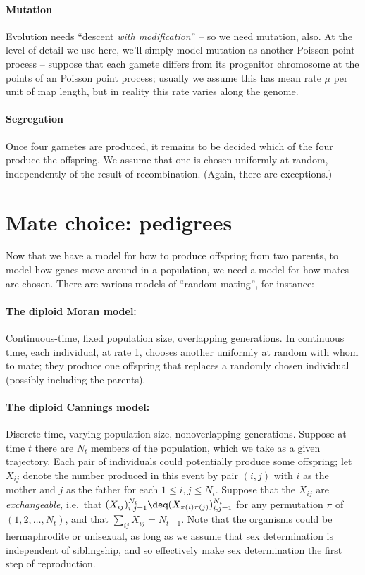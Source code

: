 \paragraph{Mutation}
Evolution needs ``descent \emph{with modification}'' -- so we need mutation, also.
At the level of detail we use here, we'll simply model mutation as another Poisson point process --
suppose that each gamete differs from its progenitor chromosome at the points of an Poisson point process;
usually we assume this has mean rate $\mu$ per unit of map length,
but in reality this rate varies along the genome.

\paragraph{Segregation}
Once four gametes are produced, it remains to be decided which of the four produce the offspring.
We assume that one is chosen uniformly at random,
independently of the result of recombination.
(Again, there are exceptions.)


\section{Mate choice: pedigrees}

Now that we have a model for how to produce offspring from two parents,
to model how genes move around in a population,
we need a model for how mates are chosen.
There are various models of ``random mating'',
for instance:

\paragraph{The diploid Moran model:}
Continuous-time, fixed population size, overlapping generations.
In continuous time, each individual, at rate 1, chooses another uniformly at random
with whom to mate;
they produce one offspring
that replaces a randomly chosen individual (possibly including the parents).

\paragraph{The diploid Cannings model:}
Discrete time, varying population size, nonoverlapping generations.
Suppose at time $t$ there are $N_t$ members of the population,
which we take as a given trajectory.
Each pair of individuals could potentially produce some offspring;
let $X_{ij}$ denote the number produced in this event by pair $(i,j)$ with $i$ as the mother and $j$ as the father for each $1 \le i,j \le N_{t}$.
Suppose that the $X_{ij}$ are \emph{exchangeable},
i.e.\ that $(X_{ij})_{i,j=1}^{N_{t}} \deq (X_{\pi(i)\pi(j)})_{i,j=1}^{N_{t}}$ for any permutation $\pi$ of $(1,2,\ldots,N_{t})$,
and that $\sum_{ij} X_{ij} = N_{t+1}$.
Note that the organisms could be hermaphrodite or unisexual,
as long as we assume that sex determination is independent of siblingship,
and so effectively make sex determination the first step of reproduction.



